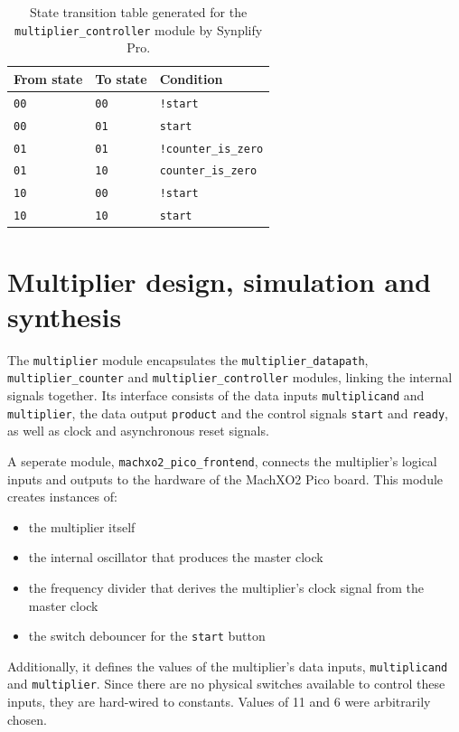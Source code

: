\documentclass[a4paper]{article}
\begin{document}
\begin{table}[tp]
  \centering
  \begin{tabular}{lll}
    \toprule
    From state & To state & Condition \\
    \midrule
    \texttt{00} & \texttt{00} & \texttt{!start} \\
    \texttt{00} & \texttt{01} & \texttt{start} \\
    \texttt{01} & \texttt{01} & \texttt{!counter\_is\_zero} \\
    \texttt{01} & \texttt{10} & \texttt{counter\_is\_zero} \\
    \texttt{10} & \texttt{00} & \texttt{!start} \\
    \texttt{10} & \texttt{10} & \texttt{start} \\
    \bottomrule
  \end{tabular}
  \caption{State transition table generated for the \texttt{multiplier\_controller} module by Synplify Pro.}
  \label{tab:fsm}
\end{table}

\section{Multiplier design, simulation and synthesis}
\label{sec:mult}

The \texttt{multiplier} module encapsulates the \texttt{multiplier\_datapath}, \texttt{multiplier\_counter} and \texttt{multiplier\_controller} modules, linking the internal signals together. Its interface consists of the data inputs \texttt{multiplicand} and \texttt{multiplier}, the data output \texttt{product} and the control signals \texttt{start} and \texttt{ready}, as well as clock and asynchronous reset signals.

A seperate module, \texttt{machxo2\_pico\_frontend}, connects the multiplier's logical inputs and outputs to the hardware of the MachXO2 Pico board. This module creates instances of:
\begin{itemize}
  \item the multiplier itself
  \item the internal oscillator that produces the master clock
  \item the frequency divider that derives the multiplier's clock signal from the master clock
  \item the switch debouncer for the \texttt{start} button
\end{itemize}
Additionally, it defines the values of the multiplier's data inputs, \texttt{multiplicand} and \texttt{multiplier}. Since there are no physical switches available to control these inputs, they are hard-wired to constants. Values of 11 and 6 were arbitrarily chosen.
\end{document}
